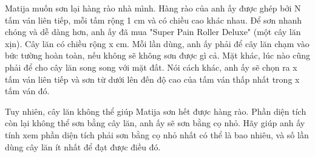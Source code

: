 Matija muốn sơn lại hàng rào nhà mình. Hàng rào của anh ấy được ghép bởi N tấm ván liên tiếp, mỗi tấm rộng 1 cm và có chiều cao khác nhau. Để sơn nhanh chóng và dễ dàng hơn, anh ấy đã mua "Super Pain Roller Deluxe" (một cây lăn xịn). Cây lăn có chiều rộng x cm. Mỗi lần dùng, anh ấy phải để cây lăn chạm vào bức tường hoàn toàn, nếu không sẽ không sơn được gì cả. Mặt khác, lúc nào cũng phải để cho cây lăn song song với mặt đất. Nói cách khác, anh ấy sẽ chọn ra x tấm ván liên tiếp và sơn từ dưới lên đến độ cao của tấm ván thấp nhất trong x tấm ván đó.  

   Tuy nhiên, cây lăn không thể giúp Matija sơn hết được hàng rào. Phần diện tích còn lại không thể sơn bằng cây lăn, anh ấy sẽ sơn bằng cọ nhỏ. Hãy giúp anh ấy tính xem phần diện tích phải sơn bằng cọ nhỏ nhất có thể là bao nhiêu, và số lần dùng cây lăn ít nhất để đạt được điều đó.